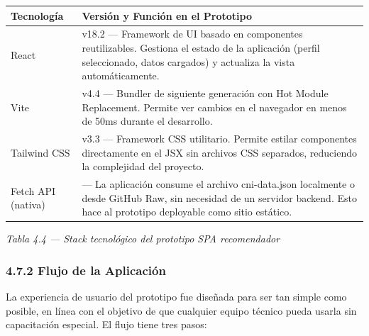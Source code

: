 \documentclass[journal]{IEEEtran}
\begin{document}
\begin{table}[htbp]
\centering
\scriptsize
\begin{tabularx}{\textwidth}{|Y|Y|}
\hline
\textbf{Tecnología} & \textbf{Versión y Función en el Prototipo} \\
\hline
React & v18.2 --- Framework de UI basado en componentes reutilizables. Gestiona el estado de la aplicación (perfil seleccionado, datos cargados) y actualiza la vista automáticamente. \\
Vite & v4.4 --- Bundler de siguiente generación con Hot Module Replacement. Permite ver cambios en el navegador en menos de 50ms durante el desarrollo. \\
Tailwind CSS & v3.3 --- Framework CSS utilitario. Permite estilar componentes directamente en el JSX sin archivos CSS separados, reduciendo la complejidad del proyecto. \\
Fetch API (nativa) & --- La aplicación consume el archivo cni-data.json localmente o desde GitHub Raw, sin necesidad de un servidor backend. Esto hace al prototipo deployable como sitio estático. \\
\hline
\end{tabularx}
\end{table}

\begin{center}\emph{\emph{Tabla 4.4 --- Stack tecnológico del prototipo SPA recomendador}}\end{center}

\subsubsection{4.7.2 Flujo de la Aplicación}

La experiencia de usuario del prototipo fue diseñada para ser tan simple como posible, en línea con el objetivo de que cualquier equipo técnico pueda usarla sin capacitación especial. El flujo tiene tres pasos:
\end{document}
